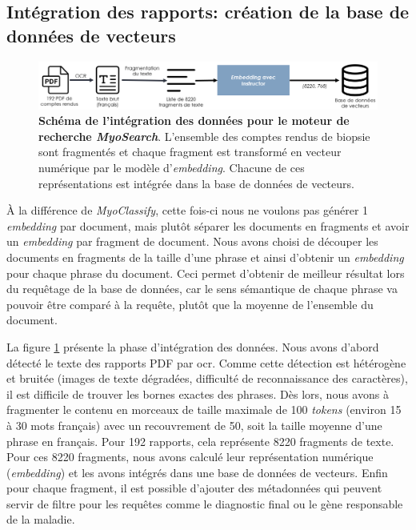 \subsection{Intégration des rapports: création de la base de données de vecteurs}
\begin{figure}[!ht]
 \centering
 \includegraphics[width=1\textwidth]{figures/myosearch_ingest.png}
 \caption[Intégration des données dans \textit{MyoSearch}]{\textbf{Schéma de l'intégration des données pour le moteur de recherche \textit{MyoSearch}}. L'ensemble des comptes rendus de biopsie sont fragmentés et chaque fragment est transformé en vecteur numérique par le modèle d'\textit{embedding}. Chacune de ces représentations est intégrée dans la base de données de vecteurs.}
 \label{fig:myosearch_ingest}
\end{figure}

À la différence de \textit{MyoClassify}, cette fois-ci nous ne voulons pas générer 1 \textit{embedding} par document, mais plutôt séparer les documents en fragments et avoir un \textit{embedding} par fragment de document. Nous avons choisi de découper les documents en fragments de la taille d'une phrase et ainsi d'obtenir un \textit{embedding} pour chaque phrase du document. Ceci permet d'obtenir de meilleur résultat lors du requêtage de la base de données, car le sens sémantique de chaque phrase va pouvoir être comparé à la requête, plutôt que la moyenne de l'ensemble du document.

La figure \ref{fig:myosearch_ingest} présente la phase d'intégration des données. Nous avons d'abord détecté le texte des rapports PDF par \gls{ocr}. Comme cette détection est hétérogène et bruitée (images de texte dégradées, difficulté de reconnaissance des caractères), il est difficile de trouver les bornes exactes des phrases. Dès lors, nous avons à fragmenter le contenu en morceaux de taille maximale de 100 \textit{tokens} (environ 15 à 30 mots français) avec un recouvrement de 50, soit la taille moyenne d'une phrase en français. Pour 192 rapports, cela représente 8220 fragments de texte. Pour ces 8220 fragments, nous avons calculé leur représentation numérique (\textit{embedding}) et les avons intégrés dans une base de données de vecteurs. Enfin pour chaque fragment, il est possible d'ajouter des métadonnées qui peuvent servir de filtre pour les requêtes comme le diagnostic final ou le gène responsable de la maladie.

